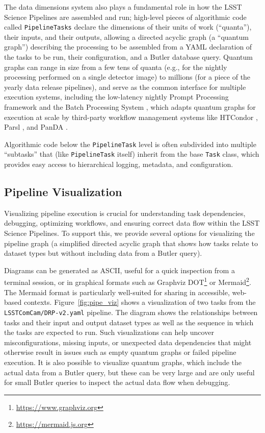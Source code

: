 The data dimensions system also plays a fundamental role in how the LSST Science Pipelines are assembled and run; high-level pieces of algorithmic code called \texttt{PipelineTasks} declare the dimensions of their units of work (``quanta''), their inputs, and their outputs, allowing a directed acyclic graph (a ``quantum graph'') describing the processing to be assembled from a YAML declaration of the tasks to be run, their configuration, and a Butler database query.
Quantum graphs can range in size from a few tens of quanta (e.g., for the nightly processing performed on a single detector image) to millions (for a piece of the yearly data release pipelines), and serve as the common interface for multiple execution systems, including the low-latency nightly Prompt Processing framework \citep{DMTN-219} and the Batch Processing System \citep[BPS;][]{2025ASPC..538..325G}, which adapts quantum graphs for execution at scale by third-party workflow management systems like HTCondor \citep{2022zndo...2579447H}, Parsl \citep{10.1145/3307681.3325400}, and PanDA \citep{2024EPJWC.29504026K}.

Algorithmic code below the \texttt{PipelineTask} level is often subdivided into multiple ``subtasks'' that (like \texttt{PipelineTask} itself) inherit from the base \texttt{Task} class, which provides easy access to hierarchical logging, metadata, and configuration.

\subsection{Pipeline Visualization}
\label{sec:pipeline_visualization}

Visualizing pipeline execution is crucial for understanding task dependencies, debugging, optimizing workflows, and ensuring correct data flow within the LSST Science Pipelines.
To support this, we provide several options for visualizing the pipeline graph (a simplified directed acyclic graph that shows how tasks relate to dataset types but without including data from a Butler query).

Diagrams can be generated as ASCII, useful for a quick inspection from a terminal session, or in graphical formats such as Graphviz DOT\footnote{\url{https://www.graphviz.org}} or Mermaid\footnote{\url{https://mermaid.js.org}}.
The Mermaid format is particularly well-suited for sharing in accessible, web-based contexts.
Figure~\ref{fig:pipe_viz} shows a visualization of two tasks from the \texttt{LSSTComCam/DRP-v2.yaml} pipeline.
The diagram shows the relationships between tasks and their input and output dataset types as well as the sequence in which the tasks are expected to run.
Such visualizations can help uncover misconfigurations, missing inputs, or unexpected data dependencies that might otherwise result in issues such as empty quantum graphs or failed pipeline execution.
It is also possible to visualize quantum graphs, which include the actual data from a Butler query, but these can be very large and are only useful for small Butler queries to inspect the actual data flow when debugging.

